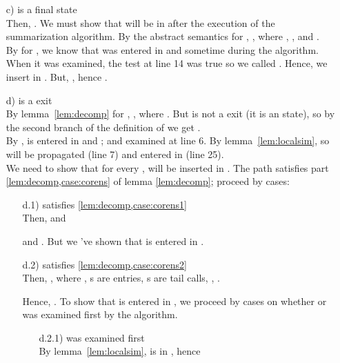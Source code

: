 \documentclass{LMCS}
\theoremstyle{definition} \newtheorem{property}[thm]{Property}
\begin{document}
\begin{enumerate}[]
\begin{enumerate}[]
  \end{enumerate}
\item[c)]
  \astat{} is a final state \\
  Then, . 
  We must show that \atol{\astat} will be in \finals{} after the execution of
  the summarization algorithm. 
  By the abstract semantics for , 
  , 
  where , 
  ,
  and . \\
  By \ih{} for , we know that 
   was entered in \work{} and \summary{}
  sometime during the algorithm.
  When it was examined, the test at line 14 was true so we called
  \srp.
  Hence, we insert  in \finals.
  But, , hence .
\item[d)]
  \astat{} is a \daceval{} exit \\
  By lemma~\ref{lem:decomp} for , 
  ,
  where . 
  But  is not a \daceval{} exit (it is an \daapply{} state), 
  so by the second branch of the definition of \dcoren{} 
  we get . \\
  By \ih{},  is entered in \seen{} and
  \work{}; and examined at line 6.
  By lemma~\ref{lem:localsim},  
  so  will be propagated (line 7)
  and entered in \seen{} (line 25). \\
  We need to show that for every ,
   will be inserted in \seen{}.
  The path  satisfies
  part \ref{lem:decomp,case:corens} of lemma \ref{lem:decomp};
  proceed by cases:
  \begin{enumerate}[]
  \item[d.1)]
     satisfies \ref{lem:decomp,case:corens1}\\
    Then,  and 
    
    and .
    But we 've shown that  is entered in \seen.
  \item[d.2)]
     satisfies \ref{lem:decomp,case:corens2}\\
    Then,
    , 
    where , s are entries, s are tail calls,
    , 
    .

    Hence, .
    To show that  is entered in \seen,
    we proceed by cases on whether 
     or 
     was examined first by the algorithm.
    \begin{enumerate}[]
    \item[d.2.1)]
       was examined first \\
      By lemma~\ref{lem:localsim},
       is in , hence
      

\end{enumerate}
\end{enumerate}
\end{enumerate}
\end{document}
